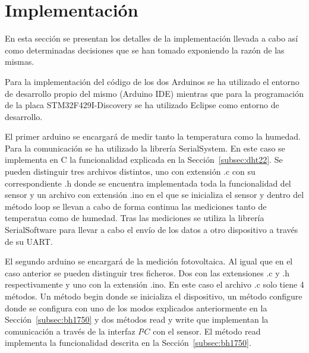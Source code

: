 \section{Implementaci\'on}\label{sec:imp}
En esta secci\'on se presentan los detalles de la implementaci\'on
llevada a cabo as\'i como determinadas decisiones que se han tomado
exponiendo la raz\'on de las mismas.

Para la implementaci\'on del c\'odigo de los dos Arduinos se ha
utilizado el entorno de desarrollo propio del mismo (Arduino IDE)
mientras que para la programaci\'on de la placa STM32F429I-Discovery
se ha utilizado Eclipse como entorno de desarrollo.

El primer arduino se encargar\'a de medir tanto la temperatura como la
humedad. Para la comunicaci\'on se ha utilizado la librer\'ia
SerialSystem. En este caso se implementa en C la funcionalidad
explicada en la Secci\'on~\ref{subsec:dht22}. Se pueden distinguir
tres archivos distintos, uno con extensi\'on .c con su correspondiente .h donde se
encuentra implementada toda la funcionalidad del sensor y un archivo
con extensi\'on .ino en el que se inicializa el sensor y dentro del
m\'etodo loop se llevan a cabo de forma continua las mediciones tanto
de temperatua como de humedad. Tras las mediciones se utiliza la
librer\'ia SerialSoftware para llevar a cabo el env\'io de los datos a
otro dispositivo a trav\'es de su UART.

El segundo arduino se encargar\'a de la medici\'on fotovoltaica. Al
igual que en el caso anterior se pueden distinguir tres ficheros. Dos
con las extensiones .c y .h respectivamente y uno con la extensi\'on
.ino. En este caso el archivo .c solo tiene 4 m\'etodos. Un m\'etodo
begin donde se inicializa el dispositivo, un m\'etodo configure donde
se configura con uno de los modos explicados anteriormente en la
Secci\'on~\ref{subsec:bh1750} y dos m\'etodos read y write que
implementan la comunicaci\'on a trav\'es de la interfaz $I²C$ con el
sensor. El m\'etodo read implementa la funcionalidad descrita en la
Secci\'on~\ref{subsec:bh1750}. 

